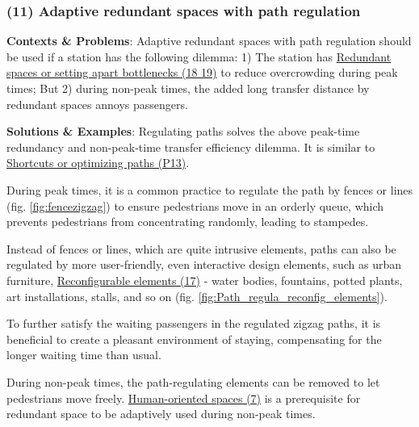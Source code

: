 \documentclass[]{article}
\begin{document}
{\subsubsection{(11) Adaptive redundant spaces with path regulation}
\label{(11) Adaptive redundant spaces with path regulation}

\textbf{Contexts \& Problems}:
Adaptive redundant spaces with path regulation should be used if a station has the following dilemma:
1) The station has \hyperref[(18 19) Redundant spaces or setting apart bottlenecks]{Redundant spaces or setting apart bottlenecks (18 19)} to reduce overcrowding during peak times; But
2) during non-peak times, the added long transfer distance by redundant spaces annoys passengers.


\textbf{Solutions \& Examples}: Regulating paths solves the above peak-time redundancy and non-peak-time transfer efficiency dilemma. It is similar to \hyperref[(P13) Shortcuts or optimizing paths]{Shortcuts or optimizing paths (P13)}.

During peak times, it is a common practice to regulate the path by fences or lines (fig. \ref{fig:fencezigzag}) to ensure pedestrians move in an orderly queue, which prevents pedestrians from concentrating randomly, leading to stampedes. 

Instead of fences or lines, which are quite intrusive elements, paths can also be regulated by more user-friendly, even interactive design elements, such as urban furniture, \hyperref[(17 26) Reconfigurable elements or spaces]{Reconfigurable elements (17)} - water bodies, fountains, potted plants, art installations, stalls, and so on (fig. \ref{fig:Path_regula_reconfig_elements}).

To further satisfy the waiting passengers in the regulated zigzag paths, it is beneficial to create a pleasant environment of staying, compensating for the longer waiting time than usual.

During non-peak times, the path-regulating elements can be removed to let pedestrians move freely. \hyperref[(7) Human-oriented spaces]{Human-oriented spaces (7)} is a prerequisite for redundant space to be adaptively used during non-peak times.

}
\end{document}
